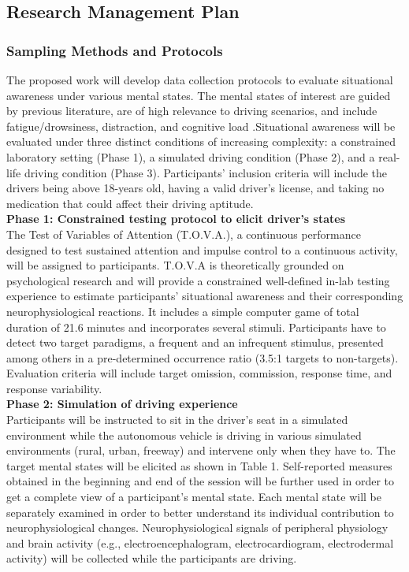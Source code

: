 \subsection{Research Management Plan}
\subsubsection{Sampling Methods and Protocols}
The proposed work will develop data collection protocols to evaluate situational awareness under various mental states. The mental states of interest are guided by previous literature, are of high relevance to driving scenarios, and include fatigue/drowsiness, distraction, and cognitive load \cite{Healey2005,Funfgeld2016,Yang2017}.Situational awareness will be evaluated under three distinct conditions of increasing complexity: a constrained laboratory setting (Phase 1), a simulated driving condition (Phase 2), and a real-life driving condition (Phase 3). Participants' inclusion criteria will include the drivers being above 18-years old, having a valid driver's license, and taking no medication that could affect their driving aptitude.\\
\textbf{Phase 1: Constrained testing protocol to elicit driver's states}\\
The Test of Variables of Attention (T.O.V.A.), a continuous performance designed to test sustained attention and impulse control to a continuous activity, will be assigned to participants. T.O.V.A is theoretically grounded on psychological research \cite{Leark1997} and will provide a constrained well-defined in-lab testing experience to estimate participants' situational awareness and their corresponding neurophysiological reactions. It includes a simple computer game of total duration of 21.6 minutes and incorporates several stimuli. Participants have to detect two target paradigms, a frequent and an infrequent stimulus, presented among others in a pre-determined occurrence ratio (3.5:1 targets to non-targets). Evaluation criteria will include target omission, commission, response time, and response variability.\\
\textbf{Phase 2: Simulation of driving experience}   \\
Participants will be instructed to sit in the driver's seat in a simulated environment while the autonomous vehicle is driving in various simulated environments (rural, urban, freeway) and intervene only when they have to. The target mental states will be elicited as shown in Table 1. Self-reported measures obtained in the beginning and end of the session will be further used in order to get a complete view of a participant's mental state. Each mental state will be separately examined in order to better understand its individual contribution to neurophysiological changes. Neurophysiological signals of peripheral physiology and brain activity (e.g., electroencephalogram, electrocardiogram, electrodermal activity) will be collected while the participants are driving.\\
